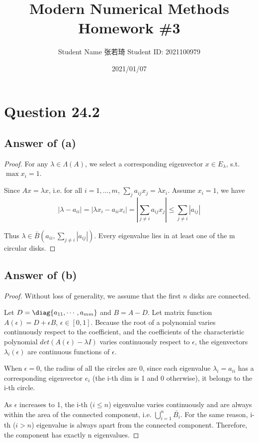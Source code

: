\documentclass[letterpaper,11pt\iffalse ,draft\fi]{article}
\begin{document}
\title{Modern Numerical Methods\\Homework \#3}
\author{Student Name 张若琦 \quad Student ID: 2021100979}
\date{2021/01/07}
\maketitle


\section*{Question 24.2}

\subsection*{Answer of (a)}
\begin{proof}
For any $\lambda\in \Lambda(A)$, we select a corresponding eigenvector $x\in E_{\lambda}$, s.t. $\max{x_i}=1$.

Since $Ax = \lambda x$, i.e. for all $i=1,\dots,m$, $\sum_{j} a_{ij}x_j = \lambda x_i$. Assume $x_i=1$, we have $$
|\lambda-a_{ii}|=|\lambda x_i-a_{ii}x_i| = |\sum_{j\neq i} a_{ij}x_j| \leq \sum_{j\neq i} |a_{ij}|
$$

Thus $\lambda\in \bar{B}(a_{ii}, \sum_{j\neq i} |a_{ij}|)$. Every eigenvalue lies in at least one of the m circular disks. 
\end{proof}


\subsection*{Answer of (b)}
\begin{proof}
Without loss of generality, we assume that the first $n$ disks are connected.

Let $D = \diag\{a_{11},\cdots,a_{mm}\}$ and $B=A-D$. Let matrix function $A(\epsilon) = D+\epsilon B$, $\epsilon\in[0,1]$. Because the root of a polynomial varies continuously respect to the coefficient, and the coefficients of the characteristic polynomial $det(A(\epsilon)-\lambda I)$ varies continuously respect to $\epsilon$, the eigenvectors $\lambda_i(\epsilon)$ are continuous functions of $\epsilon$.

When $\epsilon=0$, the radius of all the circles are 0, since each eigenvalue $\lambda_i=a_{ii}$ has a corresponding eigenvector $e_i$ (the i-th dim is 1 and 0 otherwise), it belongs to the i-th circle.

As $\epsilon$ increases to 1, the i-th ($i\leq n$) eigenvalue varies continuously and are always within the area of the connected component, i.e. $\bigcup_{i=1}^n \bar{B_i}$. For the same reason, i-th ($i>n$) eigenvalue is always apart from the connected component. Therefore, the component has exactly n eigenvalues.
\end{proof}
\end{document}
